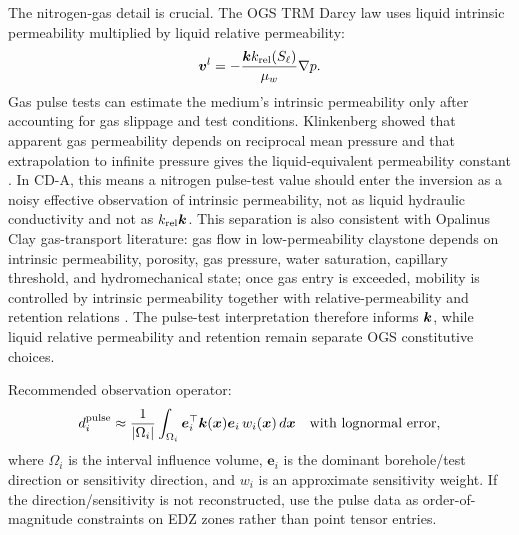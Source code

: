 The nitrogen-gas detail is crucial.  The OGS TRM Darcy law uses liquid intrinsic
permeability multiplied by liquid relative permeability:
\[
\bm v^l=-\frac{\bm{k} k_{\rm rel}(S_\ell)}{\mu_w}\nabla p .
\]
Gas pulse tests can estimate the medium's intrinsic permeability only after
accounting for gas slippage and test conditions.  Klinkenberg showed that apparent gas
permeability depends on reciprocal mean pressure and that extrapolation to infinite
pressure gives the liquid-equivalent permeability constant
\cite[pp.~200, 205--207]{Klinkenberg1941}.  In CD-A, this means a nitrogen pulse-test
value should enter the inversion as a noisy effective observation of intrinsic
permeability, not as liquid hydraulic conductivity and not as \(k_{\rm rel}\bm{k}\).
This separation is also consistent with Opalinus Clay gas-transport literature:
gas flow in low-permeability claystone depends on intrinsic permeability, porosity,
gas pressure, water saturation, capillary threshold, and hydromechanical state; once
gas entry is exceeded, mobility is controlled by intrinsic permeability together with
relative-permeability and retention relations
\cite[pp.~124--125, Sects.~2.1--2.2]{Marschall2005}.  The pulse-test interpretation
therefore informs \(\bm{k}\), while liquid relative permeability and retention remain
separate OGS constitutive choices.

Recommended observation operator:
\[
d_i^{\rm pulse}
\approx
\frac{1}{|\Omega_i|}
\int_{\Omega_i}
\bm e_i^\top \bm{k}(\bm x)\bm e_i \, w_i(\bm x)\,d\bm x
\quad \text{with lognormal error,}
\]
where \(\Omega_i\) is the interval influence volume, \(\bm e_i\) is the dominant
borehole/test direction or sensitivity direction, and \(w_i\) is an approximate
sensitivity weight.  If the direction/sensitivity is not reconstructed, use the pulse
data as order-of-magnitude constraints on EDZ zones rather than point tensor entries.

